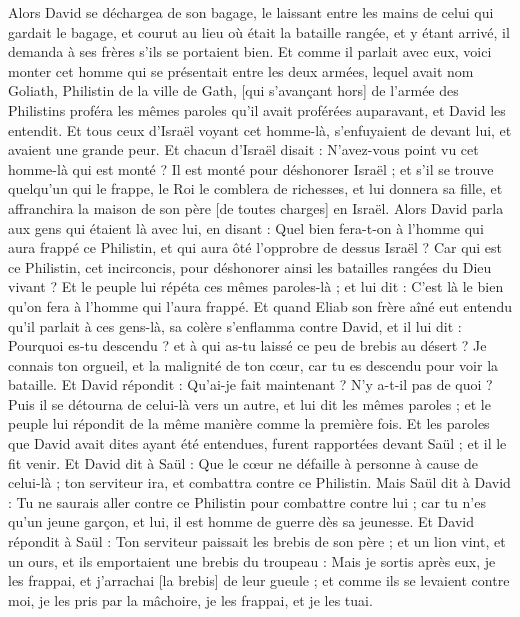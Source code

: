 \begin{multicols}{2}
Alors David se déchargea de son bagage, le laissant entre les mains de celui qui gardait le bagage, et courut au lieu où était la bataille rangée, et y étant arrivé, il demanda à ses frères s'ils se portaient bien.
Et comme il parlait avec eux, voici monter cet homme qui se présentait entre les deux armées, lequel avait nom Goliath, Philistin de la ville de Gath, [qui s'avançant hors] de l'armée des Philistins proféra les mêmes paroles qu'il avait proférées auparavant, et David les entendit.
Et tous ceux d'Israël voyant cet homme-là, s'enfuyaient de devant lui, et avaient une grande peur.
Et chacun d'Israël disait : N'avez-vous point vu cet homme-là qui est monté ? Il est monté pour déshonorer Israël ; et s'il se trouve quelqu'un qui le frappe, le Roi le comblera de richesses, et lui donnera sa fille, et affranchira la maison de son père [de toutes charges] en Israël.
Alors David parla aux gens qui étaient là avec lui, en disant : Quel bien fera-t-on à l'homme qui aura frappé ce Philistin, et qui aura ôté l'opprobre de dessus Israël ? Car qui est ce Philistin, cet incirconcis, pour déshonorer ainsi les batailles rangées du Dieu vivant ?
Et le peuple lui répéta ces mêmes paroles-là ; et lui dit : C'est là le bien qu'on fera à l'homme qui l'aura frappé.
Et quand Eliab son frère aîné eut entendu qu'il parlait à ces gens-là, sa colère s'enflamma contre David, et il lui dit : Pourquoi es-tu descendu ? et à qui as-tu laissé ce peu de brebis au désert ? Je connais ton orgueil, et la malignité de ton cœur, car tu es descendu pour voir la bataille.
Et David répondit : Qu'ai-je fait maintenant ? N'y a-t-il pas de quoi ?
Puis il se détourna de celui-là vers un autre, et lui dit les mêmes paroles ; et le peuple lui répondit de la même manière comme la première fois.
Et les paroles que David avait dites ayant été entendues, furent rapportées devant Saül ; et il le fit venir.
Et David dit à Saül : Que le cœur ne défaille à personne à cause de celui-là ; ton serviteur ira, et combattra contre ce Philistin.
Mais Saül dit à David : Tu ne saurais aller contre ce Philistin pour combattre contre lui ; car tu n'es qu'un jeune garçon, et lui, il est homme de guerre dès sa jeunesse.
Et David répondit à Saül : Ton serviteur paissait les brebis de son père ; et un lion vint, et un ours, et ils emportaient une brebis du troupeau :
Mais je sortis après eux, je les frappai, et j'arrachai [la brebis] de leur gueule ; et comme ils se levaient contre moi, je les pris par la mâchoire, je les frappai, et je les tuai.

\end{multicols}
